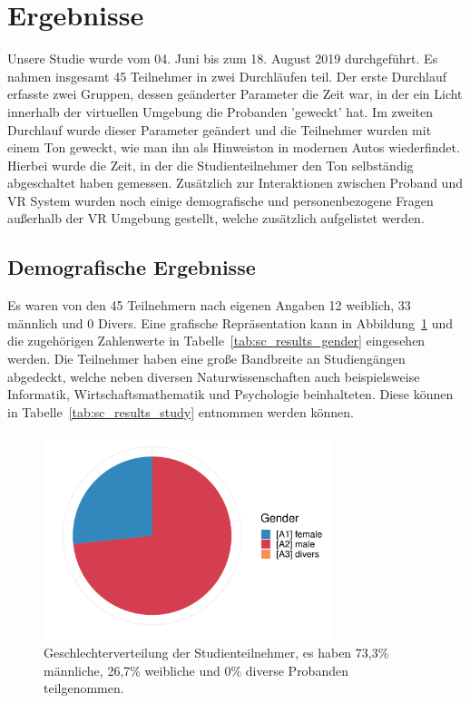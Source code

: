 \section{Ergebnisse}

Unsere Studie wurde vom 04. Juni bis zum 18. August 2019 durchgeführt. Es nahmen insgesamt 45 Teilnehmer in zwei Durchläufen teil. Der erste Durchlauf erfasste zwei Gruppen, dessen geänderter Parameter die Zeit war, in der ein Licht innerhalb der virtuellen Umgebung die Probanden 'geweckt' hat. Im zweiten Durchlauf wurde dieser Parameter geändert und die Teilnehmer wurden mit einem Ton geweckt, wie man ihn als Hinweiston in modernen Autos wiederfindet. Hierbei wurde die Zeit, in der die Studienteilnehmer den Ton selbständig abgeschaltet haben gemessen. Zusätzlich zur Interaktionen zwischen Proband und VR System wurden noch einige demografische und personenbezogene Fragen außerhalb der VR Umgebung gestellt, welche zusätzlich aufgelistet werden.

\subsection{Demografische Ergebnisse}

Es waren von den 45 Teilnehmern nach eigenen Angaben 12 weiblich, 33 männlich und 0 Divers. Eine grafische Repräsentation kann in Abbildung~\ref{fig:gender} und die zugehörigen Zahlenwerte in Tabelle~\ref{tab:sc_results_gender} eingesehen werden. Die Teilnehmer haben eine große Bandbreite an Studiengängen abgedeckt, welche neben diversen Naturwissenschaften auch beispielsweise Informatik, Wirtschaftsmathematik und Psychologie beinhalteten. Diese können in Tabelle~\ref{tab:sc_results_study} entnommen werden können.

\begin{figure}[H]
	\centering
	\includegraphics[width=0.75\textwidth]{./_StudyResults/gender}
	\caption{Geschlechterverteilung der Studienteilnehmer, es haben 73,3\% männliche, 26,7\% weibliche und 0\% diverse Probanden teilgenommen.}
	\label{fig:gender}
\end{figure}

